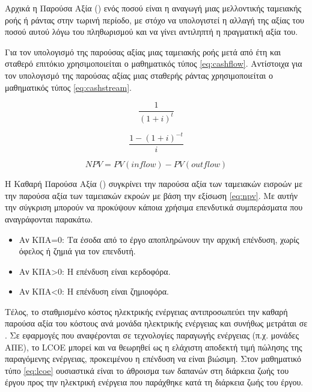 \documentclass[12pt]{report}
\begin{document}
Αρχικά η Παρούσα Αξία ({}) ενός ποσού είναι η αναγωγή μιας μελλοντικής ταμειακής ροής ή ράντας στην τωρινή περίοδο, με στόχο να υπολογιστεί η αλλαγή της αξίας του ποσού αυτού λόγω του πληθωρισμού 
και να γίνει αντιληπτή η πραγματική αξία του.

Για τον υπολογισμό της παρούσας αξίας μιας ταμειακής ροής μετά από {} έτη και σταθερό επιτόκιο {} χρησιμοποιείται ο μαθηματικός τύπος \ref{eq:cashflow}. Αντίστοιχα για τον υπολογισμό της παρούσας αξίας 
μιας σταθερής ράντας χρησιμοποιείται ο μαθηματικός τύπος \ref{eq:cashstream}.

{\large
\begin{equation}
	\frac{1}{(1+i)^t}
\label{eq:cashflow}
\end{equation}

\begin{equation}
	\frac{1- (1+i)^{-t}}{i}
\label{eq:cashstream}
\end{equation}
}
{\normalsize
\begin{equation}
	NPV = PV(inflow) - PV(outflow)
\label{eq:npv}
\end{equation}
}

Η Καθαρή Παρούσα Αξία ({}) συγκρίνει την παρούσα αξία των ταμειακών εισροών με την παρούσα αξία των ταμειακών εκροών με βάση την εξίσωση \ref{eq:npv}. Με αυτήν την σύγκριση μπορούν να προκύψουν 
κάποια χρήσιμα επενδυτικά συμπεράσματα που αναγράφονται παρακάτω.

\begin{itemize}
\item Αν ΚΠΑ=0: Τα έσοδα από το έργο αποπληρώνουν την αρχική επένδυση, χωρίς όφελος ή ζημιά για τον επενδυτή.
\item Αν ΚΠΑ\textgreater 0: Η επένδυση είναι κερδοφόρα.
\item Αν ΚΠΑ\textless 0: Η επένδυση είναι ζημιοφόρα.
\end{itemize}

Τέλος, το σταθμισμένο κόστος ηλεκτρικής ενέργειας {} αντιπροσωπεύει την καθαρή παρούσα αξία του κόστους ανά μονάδα ηλεκτρικής ενέργειας και συνήθως μετράται σε {}. 
Σε εφαρμογές που αναφέρονται σε τεχνολογίες παραγωγής ενέργειας (π.χ. μονάδες ΑΠΕ), το LCOE μπορεί και να θεωρηθεί ως η ελάχιστη αποδεκτή τιμή πώλησης της παραγόμενης ενέργειας, προκειμένου η επένδυση να είναι βιώσιμη.
Στον μαθηματικό τύπο \ref{eq:lcoe} ουσιαστικά είναι το άθροισμα των δαπανών στη διάρκεια ζωής του έργου προς την ηλεκτρική ενέργεια που παράχθηκε κατά τη διάρκεια ζωής του έργου.
\end{document}
